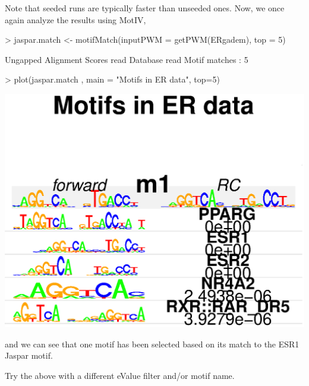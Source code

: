 \documentclass[12pt]{article}
\begin{document}
Note that seeded runs are typically faster than unseeded ones. Now, we once again analyze the results using MotIV,
\begin{Schunk}
\begin{Sinput}
> jaspar.match <- motifMatch(inputPWM = getPWM(ERgadem), top = 5)
\end{Sinput}
\begin{Soutput}
	Ungapped Alignment
	Scores read
	Database read
	Motif matches : 5
\end{Soutput}
\begin{Sinput}
> plot(jaspar.match , main = "Motifs in ER data", top=5)
\end{Sinput}
\end{Schunk}
\includegraphics{chipData_AD-MotIV-seeded-cc}

and we can see that one motif has been selected based on its match to the ESR1 Jaspar motif.
\begin{Exercise}
Try the above with a different eValue filter and/or motif name.
\end{Exercise}
\end{document}
